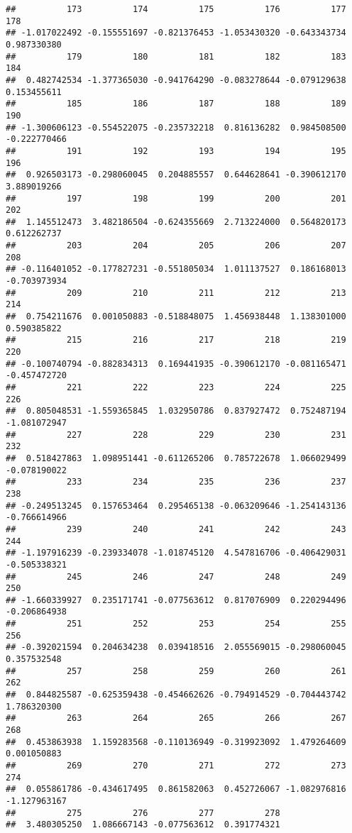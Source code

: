 \documentclass[
]{article}
\begin{document}
\begin{verbatim}
##          173          174          175          176          177          178 
## -1.017022492 -0.155551697 -0.821376453 -1.053430320 -0.643343734  0.987330380 
##          179          180          181          182          183          184 
##  0.482742534 -1.377365030 -0.941764290 -0.083278644 -0.079129638  0.153455611 
##          185          186          187          188          189          190 
## -1.300606123 -0.554522075 -0.235732218  0.816136282  0.984508500 -0.222770466 
##          191          192          193          194          195          196 
##  0.926503173 -0.298060045  0.204885557  0.644628641 -0.390612170  3.889019266 
##          197          198          199          200          201          202 
##  1.145512473  3.482186504 -0.624355669  2.713224000  0.564820173  0.612262737 
##          203          204          205          206          207          208 
## -0.116401052 -0.177827231 -0.551805034  1.011137527  0.186168013 -0.703973934 
##          209          210          211          212          213          214 
##  0.754211676  0.001050883 -0.518848075  1.456938448  1.138301000  0.590385822 
##          215          216          217          218          219          220 
## -0.100740794 -0.882834313  0.169441935 -0.390612170 -0.081165471 -0.457472720 
##          221          222          223          224          225          226 
##  0.805048531 -1.559365845  1.032950786  0.837927472  0.752487194 -1.081072947 
##          227          228          229          230          231          232 
##  0.518427863  1.098951441 -0.611265206  0.785722678  1.066029499 -0.078190022 
##          233          234          235          236          237          238 
## -0.249513245  0.157653464  0.295465138 -0.063209646 -1.254143136 -0.766614966 
##          239          240          241          242          243          244 
## -1.197916239 -0.239334078 -1.018745120  4.547816706 -0.406429031 -0.505338321 
##          245          246          247          248          249          250 
## -1.660339927  0.235171741 -0.077563612  0.817076909  0.220294496 -0.206864938 
##          251          252          253          254          255          256 
## -0.392021594  0.204634238  0.039418516  2.055569015 -0.298060045  0.357532548 
##          257          258          259          260          261          262 
##  0.844825587 -0.625359438 -0.454662626 -0.794914529 -0.704443742  1.786320300 
##          263          264          265          266          267          268 
##  0.453863938  1.159283568 -0.110136949 -0.319923092  1.479264609  0.001050883 
##          269          270          271          272          273          274 
##  0.055861786 -0.434617495  0.861582063  0.452726067 -1.082976816 -1.127963167 
##          275          276          277          278 
##  3.480305250  1.086667143 -0.077563612  0.391774321
\end{verbatim}
\end{document}
